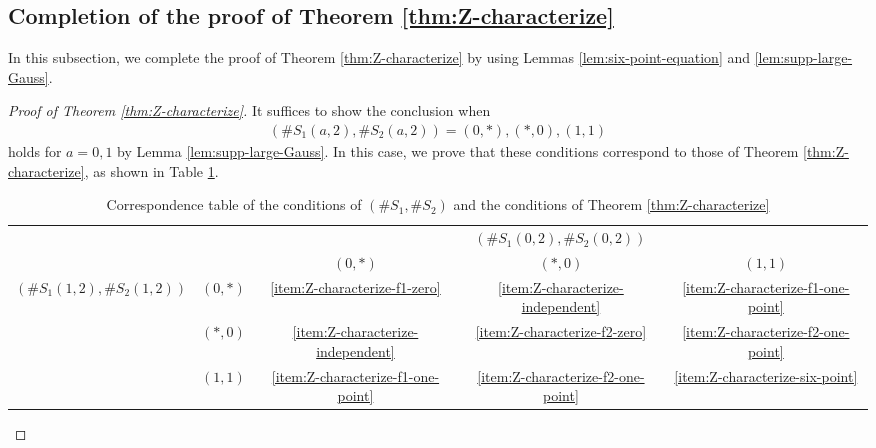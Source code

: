 \documentclass[12pt]{article}
\theoremstyle{definition}
\theoremstyle{remark}
\numberwithin{equation}{section}
\numberwithin{figure}{section}
\numberwithin{table}{section}
\begin{document}
\subsection{Completion of the proof of Theorem \ref{thm:Z-characterize}}
\label{subsec:Z-characterize-proof-complete}

In this subsection, we complete the proof of Theorem \ref{thm:Z-characterize} by using Lemmas \ref{lem:six-point-equation} and \ref{lem:supp-large-Gauss}.

\begin{proof}[Proof of Theorem \ref{thm:Z-characterize}]

It suffices to show the conclusion when
\begin{align}
    ( \# S_1 ( a , 2 ) , \# S_2 ( a , 2 ) ) = ( 0 , * ) , ( * , 0 ) , ( 1 , 1 )
\end{align}
holds for $ a = 0 , 1 $ by Lemma \ref{lem:supp-large-Gauss}.
In this case, we prove that these conditions correspond to those of Theorem \ref{thm:Z-characterize}, as shown in Table \ref{tab:Z-characterize-table}.

\begin{table}[ht]
            \centering
            \caption{Correspondence table of the conditions of $ ( \# S_1 , \# S_2 ) $ and the conditions of Theorem \ref{thm:Z-characterize}}
            \label{tab:Z-characterize-table}

\vspace{8pt}
            
\begin{tabular}{c|c||c|c|c}
\multicolumn{2}{c||}{\multirow{2}{*}{ }} & \multicolumn{3}{c}{ $ ( \# S_1 ( 0 , 2 ) , \# S_2 ( 0 , 2 ) ) $ } \\
\cline{3-5}
\multicolumn{2}{c||}{ } & $ ( 0 , * ) $ & $ ( * , 0 ) $ & $ ( 1 , 1 ) $ \\
\hline \hline
\multirow{3}{*}{ $ ( \# S_1 ( 1 , 2 ) , \# S_2 ( 1 , 2 ) ) $ } & $ ( 0 , * ) $ & \ref{item:Z-characterize-f1-zero} & \ref{item:Z-characterize-independent} & \ref{item:Z-characterize-f1-one-point} \\
\cline{2-5}
& $ ( * , 0 ) $ & \ref{item:Z-characterize-independent} & \ref{item:Z-characterize-f2-zero} & \ref{item:Z-characterize-f2-one-point} \\
\cline{2-5}
& $ ( 1 , 1 ) $ & \ref{item:Z-characterize-f1-one-point} & \ref{item:Z-characterize-f2-one-point} & \ref{item:Z-characterize-six-point}
\end{tabular}
\end{table}


\end{proof}
\end{document}

